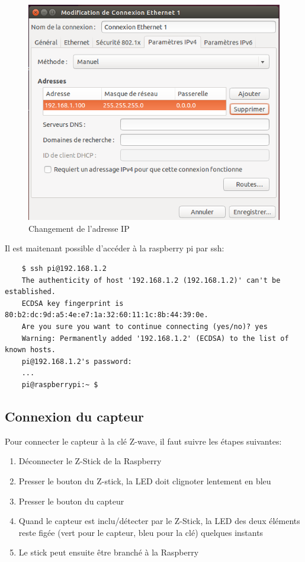 \begin{figure}[H]
	\begin{center}
		\includegraphics[width=14cm]{img/vmConfig2.png}
		\caption{Changement de l'adresse IP}
		\label{evLinuxConfig2}
	\end{center}
\end{figure}
Il est maitenant possible d'accéder à la raspberry pi par ssh:
\begin{lstlisting}
	$ ssh pi@192.168.1.2
	The authenticity of host '192.168.1.2 (192.168.1.2)' can't be established.
	ECDSA key fingerprint is 80:b2:dc:9d:a5:4e:e7:1a:32:60:11:1c:8b:44:39:0e.
	Are you sure you want to continue connecting (yes/no)? yes
	Warning: Permanently added '192.168.1.2' (ECDSA) to the list of known hosts.
	pi@192.168.1.2's password: 
	...
	pi@raspberrypi:~ $ 
\end{lstlisting}
\subsection{Connexion du capteur}
Pour connecter le capteur à la clé Z-wave, il faut suivre les étapes suivantes:
\begin{enumerate}
	\item Déconnecter le Z-Stick de la Raspberry
	\item Presser le bouton du Z-stick, la LED doit clignoter lentement en bleu
	\item Presser le bouton du capteur
	\item Quand le capteur est inclu/détecter par le Z-Stick, la LED des deux éléments reste figée (vert pour le capteur, bleu pour la clé) quelques instants
	\item Le stick peut ensuite être branché à la Raspberry
\end{enumerate}
